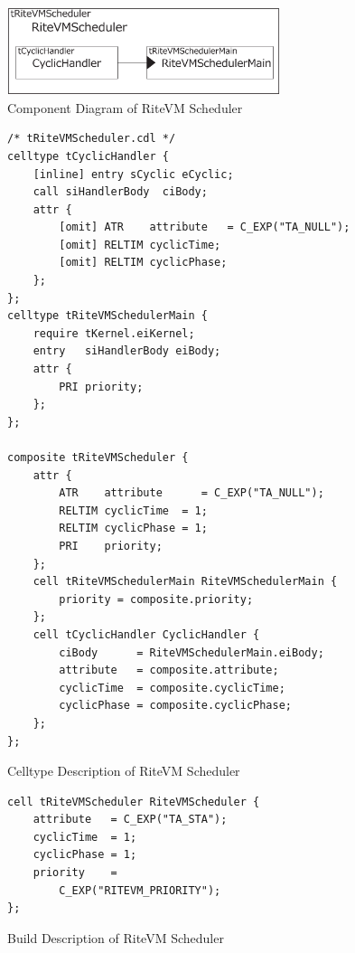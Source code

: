 \documentclass{sig-alternate-05-2015}
\begin{document}
\begin{figure}[t]
    \centering
    \includegraphics[width=8cm,clip]{figure/cyclic_handler.eps}
    \vspace{1mm}
\caption{Component Diagram of RiteVM Scheduler}
    \vspace{1mm}
\label{fig:cyclic_handler}
\end{figure}
\begin{figure}[t]
    \centering
    \begin{lstlisting}
/* tRiteVMScheduler.cdl */
celltype tCyclicHandler {
    [inline] entry sCyclic eCyclic;
    call siHandlerBody  ciBody;
    attr {
        [omit] ATR    attribute   = C_EXP("TA_NULL");
    	[omit] RELTIM cyclicTime;
    	[omit] RELTIM cyclicPhase;
    };
};
celltype tRiteVMSchedulerMain {
    require tKernel.eiKernel;
    entry   siHandlerBody eiBody;
    attr {
        PRI priority;
    };
};

composite tRiteVMScheduler {
    attr {
        ATR    attribute      = C_EXP("TA_NULL");
        RELTIM cyclicTime  = 1;
        RELTIM cyclicPhase = 1;
        PRI    priority;
    };
    cell tRiteVMSchedulerMain RiteVMSchedulerMain {
        priority = composite.priority;
    };
    cell tCyclicHandler CyclicHandler {
        ciBody      = RiteVMSchedulerMain.eiBody;
        attribute   = composite.attribute;
        cyclicTime  = composite.cyclicTime;
        cyclicPhase = composite.cyclicPhase;
    };
};
    \end{lstlisting}
    \vspace{1mm}
\caption{Celltype Description of RiteVM Scheduler}
    \vspace{1mm}
\label{celltype_cyclic_handler}
\end{figure}
\begin{figure}[t]
    \centering
    \begin{lstlisting}
cell tRiteVMScheduler RiteVMScheduler {
    attribute   = C_EXP("TA_STA");
    cyclicTime  = 1;
    cyclicPhase = 1;
    priority    =
        C_EXP("RITEVM_PRIORITY");
};
\end{lstlisting}
    \vspace{1mm}
\caption{Build Description of RiteVM Scheduler}
    \vspace{1mm}
\label{build_cyclic_handler}
\end{figure}
 
\end{document}
